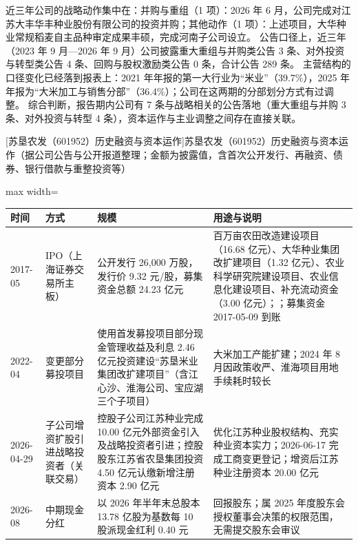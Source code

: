  近三年公司的战略动作集中在：并购与重组（1 项）：2026 年 6 月，公司完成对江苏大丰华丰种业股份有限公司的投资并购；其他动作（1 项）：上述项目，大华种业常规稻麦自主品种审定成果丰硕，完成河南子公司设立。 公告口径上，近三年（2023 年 9 月---2026 年 9 月）公司披露重大重组与并购类公告 3 条、对外投资与转型类公告 4 条、回购与股权激励类公告 0 条，合计公告 289 条。 主营结构的口径变化已经落到报表上：2021 年年报的第一大行业为“米业”（39.7\%），2025 年年报为“大米加工与销售分部”（36.4\%）；公司在这两期的分部划分方式有过调整。 综合判断，报告期内公司有 7 条与战略相关的公告落地（重大重组与并购 3 条、对外投资与转型 4 条），资本运作与主业调整之间存在直接关联。

\begin{center}\small\setlength{\tabcolsep}{4pt}
[苏垦农发（601952）历史融资与资本运作]{苏垦农发（601952）历史融资与资本运作（据公司公告与公开报道整理；金额为披露值，含首次公开发行、再融资、债券、银行借款与重整投资等）}
\begin{adjustbox}{max width=\textwidth}
\begin{tabular}{@{}p{1.45cm}p{2.55cm}p{4.05cm}p{4.95cm}@{}}
\toprule
时间 & 方式 & 规模 & 用途与说明 \\
\midrule
2017-05 & IPO（上海证券交易所主板） & 公开发行 26,\allowbreak{}000 万股，\allowbreak{}发行价 9.32 元/\allowbreak{}股，\allowbreak{}募集资金总额 24.23 亿元 & 百万亩农田改造建设项目（16.68 亿元）、\allowbreak{}大华种业集团改扩建项目（1.32 亿元）、\allowbreak{}农业科学研究院建设项目、\allowbreak{}农业信息化建设项目、\allowbreak{}补充流动资金（3.00 亿元）；；募集资金 2017-05-09 到账 \\
2022-04 & 变更部分募投项目 & 使用首发募投项目部分现金管理收益及利息 2.46 亿元投资建设“苏垦米业集团改扩建项目”（含江心沙、\allowbreak{}淮海公司、\allowbreak{}宝应湖三个子项目） & 大米加工产能扩建；2024 年 8 月因政策收严、\allowbreak{}淮海项目用地手续耗时较长 \\
2026-04-29 & 子公司增资扩股引进战略投资者（关联交易） & 控股子公司江苏种业完成 10.00 亿元外部资金引入及战略投资者引进；控股股东江苏省农垦集团投资 4.50 亿元认缴新增注册资本 2.90 亿元 & 优化江苏种业股权结构、\allowbreak{}充实种业资本实力；2026-06-17 完成工商变更登记；增资后江苏种业注册资本 20.00 亿元 \\
2026-08 & 中期现金分红 & 以 2026 年半年末总股本 13.78 亿股为基数每 10 股派现金红利 0.40 元 & 回报股东；属 2025 年度股东会授权董事会决策的权限范围，\allowbreak{}无需提交股东会审议 \\
\bottomrule
\end{tabular}
\end{adjustbox}
\end{center}

